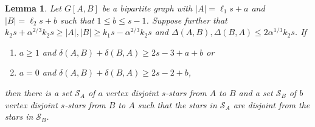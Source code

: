 \documentclass[oneside,12pt]{memoir}
\newtheorem{lemma}[theorem]{Lemma}
\begin{document}


\begin{lemma}\label{lemma:diagonalsum}
Let $G[A,B]$ be a bipartite graph with $|A|=\ell_1s+a$ and $|B|=\ell_2s+b$ such that 
$1\leq b\leq s-1$.  Suppose further that $k_2s+\alpha^{2/3}k_2s\geq |A|,|B|\geq k_1s-\alpha^{2/3}k_2s$ and $\Delta(A, B), \Delta(B, A)\leq 2\alpha^{1/3} k_2s$.  If 
\begin{enumerate}
\item $a\geq 1$ and $\delta(A, B)+\delta(B, A)\geq 2s-3+a+b$ or

\item $a=0$ and $\delta(A, B)+\delta(B, A)\geq 2s-2+b$,
\end{enumerate}
then there is a set $\mathcal{S}_A$ of $a$ vertex disjoint $s$-stars from $A$ to $B$ and a set $\mathcal{S}_B$ of $b$ vertex disjoint $s$-stars from $B$ to $A$ such that the stars in $\mathcal{S}_A$ are disjoint from the stars in $\mathcal{S}_B$.
\end{lemma}
\end{document}
